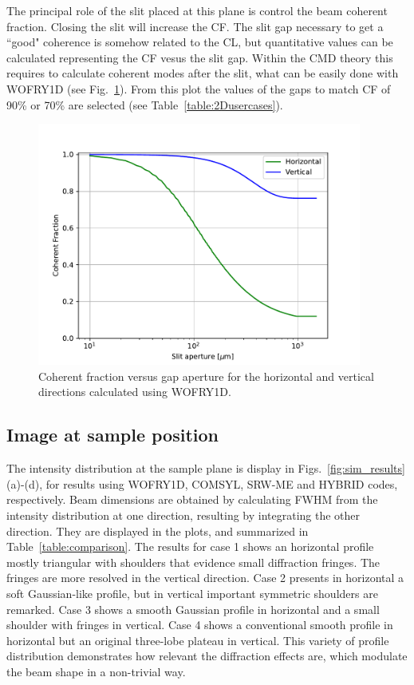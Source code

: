 \documentclass{iucr}              %
\begin{document}
The principal role of the slit placed at this plane is control the beam coherent fraction. Closing the slit will increase the CF. The slit gap necessary to get a ``good" coherence is somehow related to the CL, but quantitative values can be calculated representing the CF vesus the slit gap. Within the CMD theory this requires to calculate coherent modes after the slit, what can be easily done with WOFRY1D (see Fig.~\ref{fig:CFvsGap}). From this plot the values of the gaps to match CF of 90\% or 70\% are selected (see Table~\ref{table:2Dusercases}).

\begin{figure}
    \label{fig:CFvsGap}
    \includegraphics[width=0.95\textwidth]{figures/CFvsGap.pdf}
    \caption{Coherent fraction versus gap aperture for the horizontal and vertical directions calculated using WOFRY1D.
    }
\end{figure}

\subsection{Image at sample position}

The intensity distribution at the sample plane is display in Figs.~\ref{fig:sim_results}(a)-(d), for results using WOFRY1D, COMSYL, SRW-ME and HYBRID codes, respectively.  Beam dimensions are obtained by calculating FWHM from the intensity distribution at one direction, resulting by integrating the other direction. They are displayed in the plots, and summarized in Table~\ref{table:comparison}.
The results for case 1 shows an horizontal profile mostly triangular with shoulders that evidence small diffraction fringes. The fringes are more resolved in the vertical direction. Case 2  presents in horizontal a soft Gaussian-like profile, but in vertical important symmetric shoulders are remarked. Case 3 shows a smooth Gaussian profile in horizontal and a small shoulder with fringes in vertical. Case 4 shows a conventional smooth profile in horizontal but an original three-lobe plateau in vertical. This variety of profile distribution demonstrates how relevant the diffraction effects are, which modulate the beam shape in a non-trivial way.  
\end{document}
